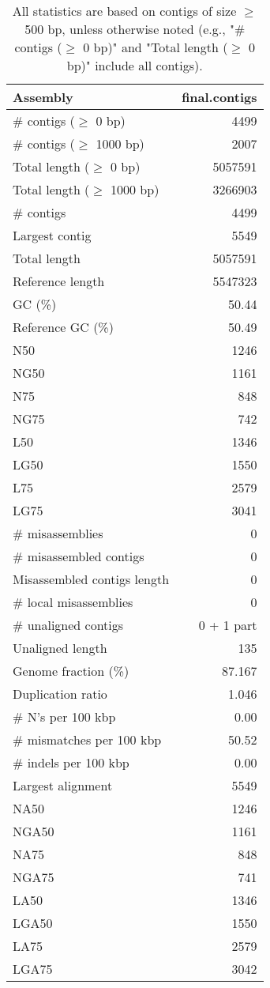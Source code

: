 \documentclass[12pt,a4paper]{article}
\begin{document}
\begin{table}[ht]
\begin{center}
\caption{All statistics are based on contigs of size $\geq$ 500 bp, unless otherwise noted (e.g., "\# contigs ($\geq$ 0 bp)" and "Total length ($\geq$ 0 bp)" include all contigs).}
\begin{tabular}{|l*{1}{|r}|}
\hline
Assembly & final.contigs \\ \hline
\# contigs ($\geq$ 0 bp) & 4499 \\ \hline
\# contigs ($\geq$ 1000 bp) & 2007 \\ \hline
Total length ($\geq$ 0 bp) & 5057591 \\ \hline
Total length ($\geq$ 1000 bp) & 3266903 \\ \hline
\# contigs & 4499 \\ \hline
Largest contig & 5549 \\ \hline
Total length & 5057591 \\ \hline
Reference length & 5547323 \\ \hline
GC (\%) & 50.44 \\ \hline
Reference GC (\%) & 50.49 \\ \hline
N50 & 1246 \\ \hline
NG50 & 1161 \\ \hline
N75 & 848 \\ \hline
NG75 & 742 \\ \hline
L50 & 1346 \\ \hline
LG50 & 1550 \\ \hline
L75 & 2579 \\ \hline
LG75 & 3041 \\ \hline
\# misassemblies & 0 \\ \hline
\# misassembled contigs & 0 \\ \hline
Misassembled contigs length & 0 \\ \hline
\# local misassemblies & 0 \\ \hline
\# unaligned contigs & 0 + 1 part \\ \hline
Unaligned length & 135 \\ \hline
Genome fraction (\%) & 87.167 \\ \hline
Duplication ratio & 1.046 \\ \hline
\# N's per 100 kbp & 0.00 \\ \hline
\# mismatches per 100 kbp & 50.52 \\ \hline
\# indels per 100 kbp & 0.00 \\ \hline
Largest alignment & 5549 \\ \hline
NA50 & 1246 \\ \hline
NGA50 & 1161 \\ \hline
NA75 & 848 \\ \hline
NGA75 & 741 \\ \hline
LA50 & 1346 \\ \hline
LGA50 & 1550 \\ \hline
LA75 & 2579 \\ \hline
LGA75 & 3042 \\ \hline
\end{tabular}
\end{center}
\end{table}
\end{document}
